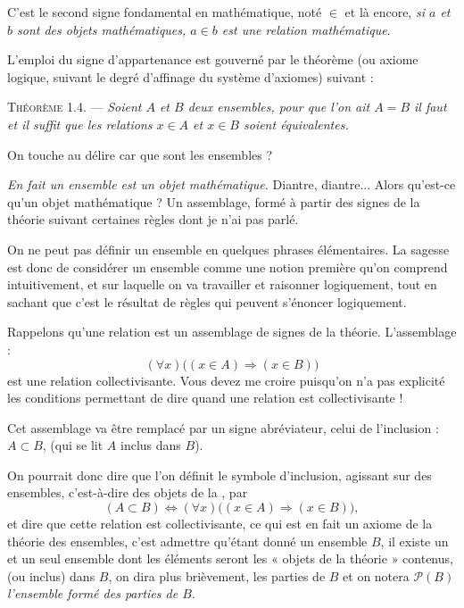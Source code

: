 C'est le second signe fondamental en mathématique, noté $\in$ et là encore, \emph{si $a$ et $b$ sont des objets mathématiques, $a\in b$ est une relation mathématique}.

L'emploi du signe d'appartenance est gouverné par le théorème (ou axiome logique, suivant le degré d'affinage du système d'axiomes) suivant :

\medskip\noindent\textsc{Théorème 1.4.} --- \emph{Soient $A$ et $B$ deux ensembles, pour que l'on ait $A=B$ il faut et il suffit que les relations $x\in A$ et $x\in B$ soient équivalentes.}

On touche au délire car que sont les ensembles ?

\emph{En fait un ensemble est un objet mathématique.} Diantre, diantre... Alors qu'est-ce qu'un objet mathématique ? Un assemblage, formé à partir des signes de la théorie suivant certaines règles dont je n'ai pas parlé.

On ne peut pas définir un ensemble en quelques phrases élémentaires. La sagesse est donc de considérer un ensemble comme une notion première qu'on comprend intuitivement, et sur laquelle on va travailler et raisonner logiquement, tout en sachant que c'est le résultat de règles qui peuvent s'énoncer logiquement.


Rappelons qu'une relation est un assemblage de signes de la théorie. L'assemblage :
\[
(\forall x)\bigl((x\in A)\Rightarrow(x\in B)\bigr)
\]
est une relation collectivisante. Vous devez me croire puisqu'on n'a pas explicité les conditions permettant de dire quand une relation est collectivisante !

Cet assemblage va être remplacé par un signe abréviateur, celui de l'inclusion : $A\subset B$, (qui se lit $A$ inclus dans $B$).

On pourrait donc dire que l'on définit le symbole d'inclusion, agissant sur des ensembles, c'est-à-dire des objets de la , par
\[
(A\subset B)\Leftrightarrow(\forall x)\bigl((x\in A)\Rightarrow(x\in B)\bigr),
\]
et dire que cette relation est collectivisante, ce qui est en fait un axiome de la théorie des ensembles, c'est admettre qu'étant donné un ensemble $B$, il existe un et un seul ensemble dont les éléments seront les « objets de la théorie » contenus, (ou inclus) dans $B$, on dira plus brièvement, les parties de $B$ et on notera $\mathcal P(B)$ \emph{l'ensemble formé des parties de $B$}.

